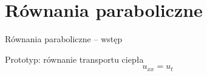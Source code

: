 \section{Równania paraboliczne}

\begin{frame}{Równania paraboliczne -- wstęp}
  \begin{block}{Prototyp: równanie transportu ciepła}
    \begin{equation}\label{7} u_{x x} = u_t \end{equation}
  \end{block}
\end{frame}
